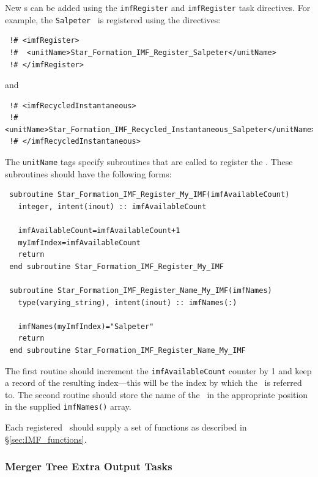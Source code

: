 New \IMF s can be added using the {\tt imfRegister} and {\tt imfRegister} task directives. For example, the {\tt Salpeter} \IMF\ is registered using the directives:
\begin{verbatim}
 !# <imfRegister>
 !#  <unitName>Star_Formation_IMF_Register_Salpeter</unitName>
 !# </imfRegister>
\end{verbatim}
and
\begin{verbatim}
 !# <imfRecycledInstantaneous>
 !#  <unitName>Star_Formation_IMF_Recycled_Instantaneous_Salpeter</unitName>
 !# </imfRecycledInstantaneous>
\end{verbatim}
The {\tt unitName} tags specify subroutines that are called to register the \IMF. These subroutines should have the following forms:
\begin{verbatim}
 subroutine Star_Formation_IMF_Register_My_IMF(imfAvailableCount)
   integer, intent(inout) :: imfAvailableCount

   imfAvailableCount=imfAvailableCount+1
   myImfIndex=imfAvailableCount
   return
 end subroutine Star_Formation_IMF_Register_My_IMF

 subroutine Star_Formation_IMF_Register_Name_My_IMF(imfNames)
   type(varying_string), intent(inout) :: imfNames(:)

   imfNames(myImfIndex)="Salpeter"
   return
 end subroutine Star_Formation_IMF_Register_Name_My_IMF
\end{verbatim}
The first routine should increment the {\tt imfAvailableCount} counter by 1 and keep a record of the resulting index---this will be the index by which the \IMF\ is referred to. The second routine should store the name of the \IMF\ in the appropriate position in the supplied {\tt imfNames()} array.

Each registered \IMF\ should supply a set of functions as described in \S\ref{sec:IMF_functions}.

\subsubsection{Merger Tree Extra Output Tasks}

